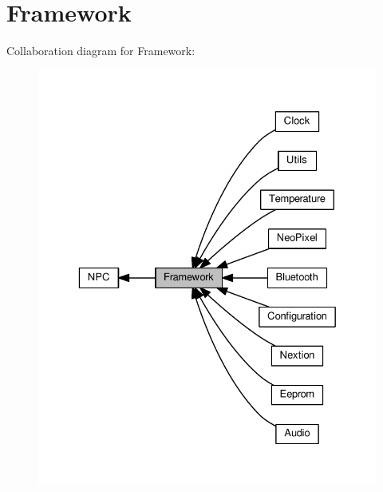 \hypertarget{group___framework}{}\section{Framework}
\label{group___framework}
Collaboration diagram for Framework\+:\nopagebreak
\begin{figure}[H]
\begin{center}
\leavevmode
\includegraphics[width=329pt]{d3/d56/group___framework}
\end{center}
\end{figure}
